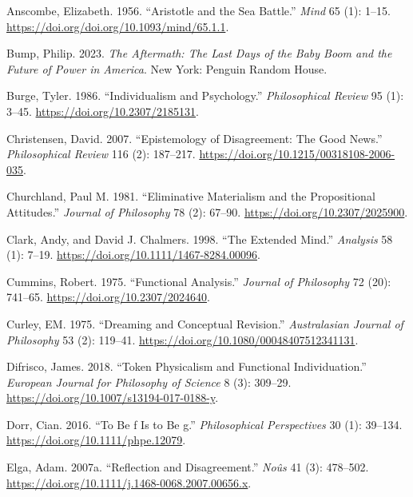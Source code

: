 \documentclass[
  12pt,
  letterpaper,
  DIV=11,
  numbers=noendperiod]{scrartcl}
\newlength{\cslhangindent}
\newenvironment{CSLReferences}[2] %
 {\begin{list}{}{%
  \setlength{\itemindent}{0pt}
  \setlength{\leftmargin}{0pt}
  \setlength{\parsep}{0pt}
  \ifodd #1
   \setlength{\leftmargin}{\cslhangindent}
   \setlength{\itemindent}{-1\cslhangindent}
  \fi
  \setlength{\itemsep}{#2\baselineskip}}}
 {\end{list}}
\begin{document}
\label{refs}
\begin{CSLReferences}{1}{0}
Anscombe, Elizabeth. 1956. {``Aristotle and the Sea Battle.''}
\emph{Mind} 65 (1): 1--15.
\url{https://doi.org/doi.org/10.1093/mind/65.1.1}.

Bump, Philip. 2023. \emph{The Aftermath: The Last Days of the Baby Boom
and the Future of Power in America}. New York: Penguin Random House.

Burge, Tyler. 1986. {``Individualism and Psychology.''}
\emph{Philosophical Review} 95 (1): 3--45.
\url{https://doi.org/10.2307/2185131}.

Christensen, David. 2007. {``Epistemology of Disagreement: The Good
News.''} \emph{Philosophical Review} 116 (2): 187--217.
\url{https://doi.org/10.1215/00318108-2006-035}.

Churchland, Paul M. 1981. {``Eliminative Materialism and the
Propositional Attitudes.''} \emph{Journal of Philosophy} 78 (2): 67--90.
\url{https://doi.org/10.2307/2025900}.

Clark, Andy, and David J. Chalmers. 1998. {``The Extended Mind.''}
\emph{Analysis} 58 (1): 7--19.
\url{https://doi.org/10.1111/1467-8284.00096}.

Cummins, Robert. 1975. {``Functional Analysis.''} \emph{Journal of
Philosophy} 72 (20): 741--65. \url{https://doi.org/10.2307/2024640}.

Curley, EM. 1975. {``Dreaming and Conceptual Revision.''}
\emph{Australasian Journal of Philosophy} 53 (2): 119--41.
\url{https://doi.org/10.1080/00048407512341131}.

Difrisco, James. 2018. {``Token Physicalism and Functional
Individuation.''} \emph{European Journal for Philosophy of Science} 8
(3): 309--29. \url{https://doi.org/10.1007/s13194-017-0188-y}.

Dorr, Cian. 2016. {``To Be f Is to Be g.''} \emph{Philosophical
Perspectives} 30 (1): 39--134. \url{https://doi.org/10.1111/phpe.12079}.

Elga, Adam. 2007a. {``Reflection and Disagreement.''} \emph{No{û}s} 41
(3): 478--502. \url{https://doi.org/10.1111/j.1468-0068.2007.00656.x}.


\end{CSLReferences}
\end{document}
